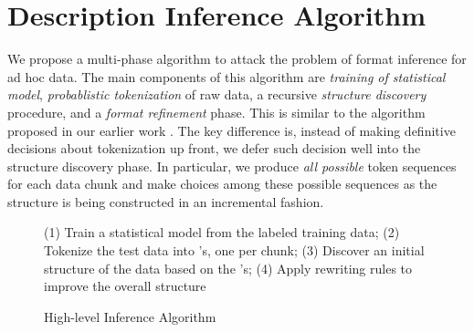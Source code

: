 
\section{Description Inference Algorithm}\label{sec:algo}

We propose a multi-phase algorithm to attack the problem of
format inference for ad hoc data. 
The main components of
this algorithm are {\em training of statistical model}, 
{\em probablistic tokenization} of raw data, 
a recursive {\em structure discovery} procedure,
and a {\em format refinement} phase. This is similar to 
the algorithm proposed in our earlier work \cite{fisher+:dirttoshovels}. 
The key difference is, instead of making definitive decisions about 
tokenization up front, we defer such decision well into the structure
discovery phase. In particular, we produce {\em all possible} token 
sequences for each data chunk and make choices among these possible 
sequences as the structure is being constructed in an incremental fashion.


\begin{figure}[t]
\begin{centercode}
(1) Train a statistical model from the labeled training data;
(2) Tokenize the test data into \seqset's, one \seqset{} per chunk;
(3) Discover an initial structure of the data based on the \seqset's;
(4) Apply rewriting rules to improve the overall structure
\end{centercode}
\caption{High-level Inference Algorithm}\label{fig:algo}
\end{figure}

